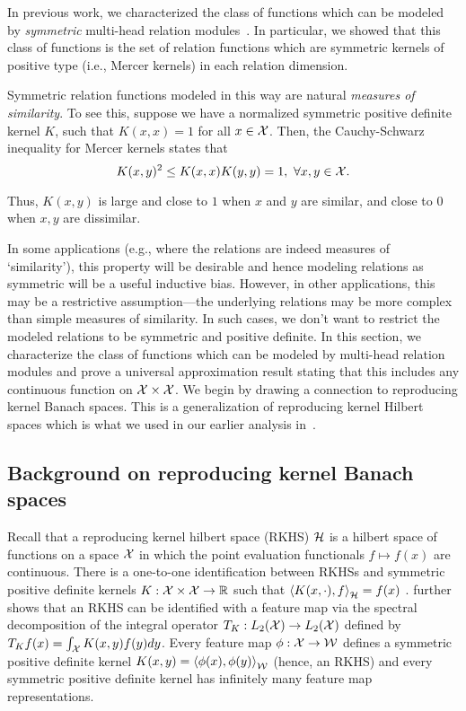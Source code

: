 In previous work, we characterized the class of functions which can be modeled by \textit{symmetric} multi-head relation modules~\parencite{altabaaAbstractorsTransformer2023}. In particular, we showed that this class of functions is the set of relation functions which are symmetric kernels of positive type (i.e., Mercer kernels) in each relation dimension.

Symmetric relation functions modeled in this way are natural \textit{measures of similarity}. To see this, suppose we have a normalized symmetric positive definite kernel $K$, such that $K(x,x) = 1$ for all $x \in {\mathcal{X}}$. Then, the Cauchy-Schwarz inequality for Mercer kernels states that
\begin{equation}
    K(x, y)^2 \leq K(x, x) K(y, y) = 1, \ \forall x, y \in {\mathcal{X}}.
\end{equation}

Thus, $K(x,y)$ is large and close to $1$ when $x$ and $y$ are similar, and close to $0$ when $x, y$ are dissimilar. 

In some applications (e.g., where the relations are indeed measures of `similarity'), this property will be desirable and hence modeling relations as symmetric will be a useful inductive bias. However, in other applications, this may be a restrictive assumption---the underlying relations may be more complex than simple measures of similarity. In such cases, we don't want to restrict the modeled relations to be symmetric and positive definite. In this section, we characterize the class of functions which can be modeled by multi-head relation modules and prove a universal approximation result stating that this includes any continuous function on ${\mathcal{X}} \times {\mathcal{X}}$. We begin by drawing a connection to reproducing kernel Banach spaces. This is a generalization of reproducing kernel Hilbert spaces which is what we used in our earlier analysis in~\parencite{altabaaAbstractorsTransformer2023}.


\subsection{Background on reproducing kernel Banach spaces}

Recall that a reproducing kernel hilbert space (RKHS) ${\mathcal{H}}$ is a hilbert space of functions on a space ${\mathcal{X}}$ in which the point evaluation functionals $f \mapsto f(x)$ are continuous. There is a one-to-one identification between RKHSs and symmetric positive definite kernels $K: {\mathcal{X}} \times {\mathcal{X}} \to \mathbb{R}$ such that $\left \langle K(x, \cdot), f \right\rangle_{\mathcal{H}} = f(x)$ \parencite{moore-aronszajn}. \parencite{mercerFunctionsPositive1909} further shows that an RKHS can be identified with a feature map via the spectral decomposition of the integral operator $T_K: L_2({\mathcal{X}}) \to L_2({\mathcal{X}})$ defined by $T_K f(x) = \int_{\mathcal{X}} K(x, y) f(y) dy$. Every feature map $\phi: {\mathcal{X}} \to {\mathcal{W}}$ defines a symmetric positive definite kernel $K(x, y) = \left \langle \phi(x), \phi(y) \right\rangle_{\mathcal{W}}$ (hence, an RKHS) and every symmetric positive definite kernel has infinitely many feature map representations.

